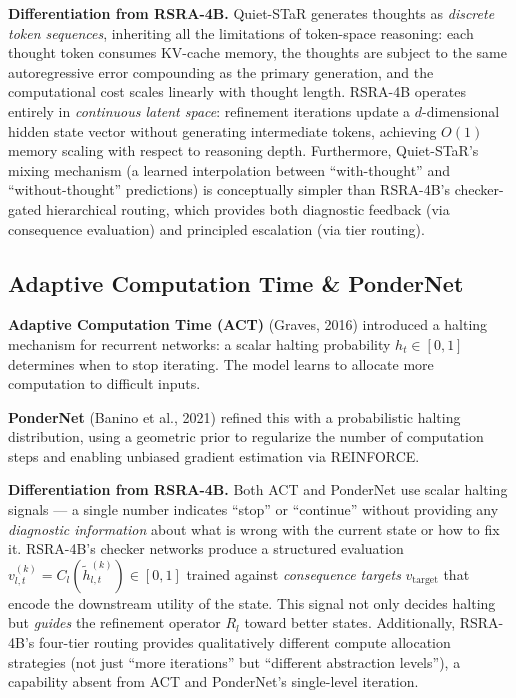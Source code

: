 \documentclass[11pt,a4paper]{article}
\theoremstyle{definition}
\begin{document}
\textbf{Differentiation from RSRA-4B.} Quiet-STaR generates thoughts as \textit{discrete token sequences}, inheriting all the limitations of token-space reasoning: each thought token consumes KV-cache memory, the thoughts are subject to the same autoregressive error compounding as the primary generation, and the computational cost scales linearly with thought length. RSRA-4B operates entirely in \textit{continuous latent space}: refinement iterations update a $d$-dimensional hidden state vector without generating intermediate tokens, achieving $O(1)$ memory scaling with respect to reasoning depth. Furthermore, Quiet-STaR's mixing mechanism (a learned interpolation between ``with-thought'' and ``without-thought'' predictions) is conceptually simpler than RSRA-4B's checker-gated hierarchical routing, which provides both diagnostic feedback (via consequence evaluation) and principled escalation (via tier routing).

\subsection{Adaptive Computation Time \& PonderNet}

\textbf{Adaptive Computation Time (ACT)} (Graves, 2016) introduced a halting mechanism for recurrent networks: a scalar halting probability $h_t \in [0, 1]$ determines when to stop iterating. The model learns to allocate more computation to difficult inputs.

\textbf{PonderNet} (Banino et al., 2021) refined this with a probabilistic halting distribution, using a geometric prior to regularize the number of computation steps and enabling unbiased gradient estimation via REINFORCE.

\textbf{Differentiation from RSRA-4B.} Both ACT and PonderNet use scalar halting signals --- a single number indicates ``stop'' or ``continue'' without providing any \textit{diagnostic information} about what is wrong with the current state or how to fix it. RSRA-4B's checker networks produce a structured evaluation $v_{l,t}^{(k)} = C_l(\tilde{h}_{l,t}^{(k)}) \in [0, 1]$ trained against \textit{consequence targets} $v_{\text{target}}$ that encode the downstream utility of the state. This signal not only decides halting but \textit{guides} the refinement operator $R_l$ toward better states. Additionally, RSRA-4B's four-tier routing provides qualitatively different compute allocation strategies (not just ``more iterations'' but ``different abstraction levels''), a capability absent from ACT and PonderNet's single-level iteration.
\end{document}
